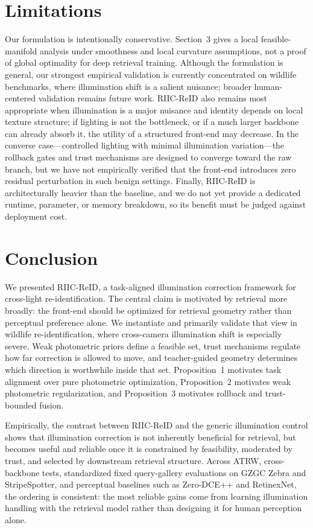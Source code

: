 \documentclass[sigconf,screen,review,anonymous]{acmart}
\begin{document}
\section{Limitations}

Our formulation is intentionally conservative.
Section~3 gives a local feasible-manifold analysis under smoothness and local
curvature assumptions, not a proof of global optimality for deep retrieval
training.
Although the formulation is general, our strongest empirical validation is
currently concentrated on wildlife benchmarks, where illumination shift is a
salient nuisance; broader human-centered validation remains future work.
RIIC-ReID also remains most appropriate when illumination is a major nuisance and
identity depends on local texture structure; if lighting is not the bottleneck,
or if a much larger backbone can already absorb it, the utility of a structured
front-end may decrease.
In the converse case---controlled lighting with minimal illumination
variation---the rollback gates and trust mechanisms are designed to converge
toward the raw branch, but we have not empirically verified that the front-end
introduces zero residual perturbation in such benign settings.
Finally, RIIC-ReID is architecturally heavier than the baseline, and we do not
yet provide a dedicated runtime, parameter, or memory breakdown, so its benefit
must be judged against deployment cost.

\section{Conclusion}

We presented RIIC-ReID, a task-aligned illumination correction framework for
cross-light re-identification. The central claim is motivated by retrieval more
broadly: the
front-end should be optimized for retrieval geometry rather than perceptual
preference alone. We instantiate and primarily validate that view in wildlife
re-identification, where cross-camera illumination shift is especially severe.
Weak photometric priors define a feasible set, trust mechanisms regulate how
far correction is allowed to move, and teacher-guided geometry determines
which direction is worthwhile inside that set. Proposition~1 motivates task
alignment over pure photometric optimization, Proposition~2 motivates weak
photometric regularization, and Proposition~3 motivates rollback and
trust-bounded fusion.

Empirically, the contrast between RIIC-ReID and the generic illumination control
shows that illumination correction is not inherently beneficial for retrieval,
but becomes useful and reliable once it is constrained by feasibility,
moderated by trust, and selected by downstream retrieval structure.
Across ATRW, cross-backbone tests, standardized fixed query-gallery evaluations
on GZGC Zebra and StripeSpotter, and perceptual baselines such as Zero-DCE++
and RetinexNet, the ordering is consistent: the most reliable gains come from
learning illumination handling with the retrieval model rather than designing it
for human perception alone.



\end{document}

